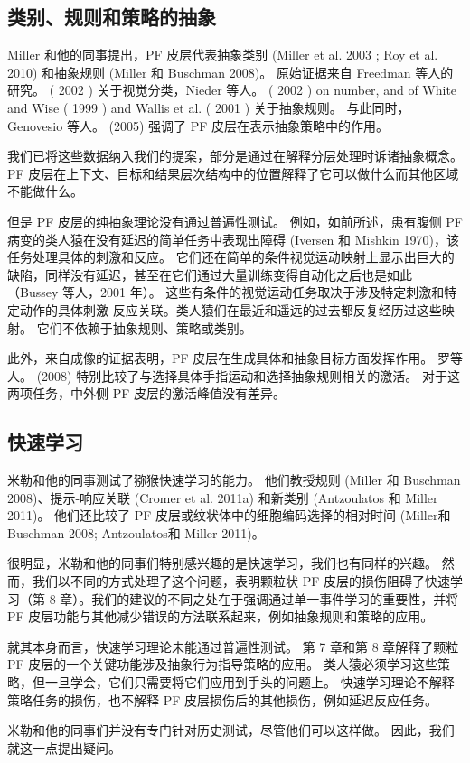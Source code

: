 \subsection{类别、规则和策略的抽象}
Miller 和他的同事提出，PF 皮层代表抽象类别 (Miller et al. 2003 ; Roy et al. 2010) 和抽象规则 (Miller 和 Buschman 2008)。 原始证据来自 Freedman 等人的研究。 ( 2002 ) 关于视觉分类，Nieder 等人。 ( 2002 ) on number, and of White and Wise ( 1999 ) and Wallis et al. ( 2001 ) 关于抽象规则。 与此同时，Genovesio 等人。 (2005) 强调了 PF 皮层在表示抽象策略中的作用。
\par 
我们已将这些数据纳入我们的提案，部分是通过在解释分层处理时诉诸抽象概念。 PF 皮层在上下文、目标和结果层次结构中的位置解释了它可以做什么而其他区域不能做什么。
\par 
但是 PF 皮层的纯抽象理论没有通过普遍性测试。 例如，如前所述，患有腹侧 PF 病变的类人猿在没有延迟的简单任务中表现出障碍 (Iversen 和 Mishkin 1970)，该任务处理具体的刺激和反应。 它们还在简单的条件视觉运动映射上显示出巨大的缺陷，同样没有延迟，甚至在它们通过大量训练变得自动化之后也是如此（Bussey 等人，2001 年）。 这些有条件的视觉运动任务取决于涉及特定刺激和特定动作的具体刺激-反应关联。类人猿们在最近和遥远的过去都反复经历过这些映射。 它们不依赖于抽象规则、策略或类别。
\par 
此外，来自成像的证据表明，PF 皮层在生成具体和抽象目标方面发挥作用。 罗等人。 (2008) 特别比较了与选择具体手指运动和选择抽象规则相关的激活。 对于这两项任务，中外侧 PF 皮层的激活峰值没有差异。
\subsection{快速学习}
米勒和他的同事测试了猕猴快速学习的能力。 他们教授规则 (Miller 和 Buschman 2008)、提示-响应关联 (Cromer et al. 2011a) 和新类别 (Antzoulatos 和 Miller 2011)。 他们还比较了 PF 皮层或纹状体中的细胞编码选择的相对时间 (Miller和 Buschman 2008; Antzoulatos和 Miller 2011)。
\par 
很明显，米勒和他的同事们特别感兴趣的是快速学习，我们也有同样的兴趣。 然而，我们以不同的方式处理了这个问题，表明颗粒状 PF 皮层的损伤阻碍了快速学习（第 8 章）。我们的建议的不同之处在于强调通过单一事件学习的重要性，并将 PF 皮层功能与其他减少错误的方法联系起来，例如抽象规则和策略的应用。
\par 
就其本身而言，快速学习理论未能通过普遍性测试。 第 7 章和第 8 章解释了颗粒 PF 皮层的一个关键功能涉及抽象行为指导策略的应用。 类人猿必须学习这些策略，但一旦学会，它们只需要将它们应用到手头的问题上。 快速学习理论不解释策略任务的损伤，也不解释 PF 皮层损伤后的其他损伤，例如延迟反应任务。
\par 
米勒和他的同事们并没有专门针对历史测试，尽管他们可以这样做。 因此，我们就这一点提出疑问。
